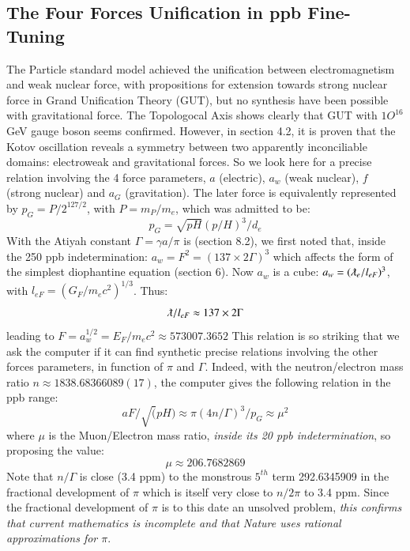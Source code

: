 \documentclass[twoside,draft]{article}
\begin{document}
\begin{sloppypar}
\subsection {The Four Forces Unification in ppb Fine-Tuning}
The Particle standard model achieved the unification between electromagnetism and weak nuclear force, with propositions for extension towards strong nuclear force in Grand Unification Theory (GUT), but no synthesis have been possible with gravitational force. The Topologocal Axis shows clearly that GUT with $1O^{16}$ GeV gauge boson seems confirmed. However, in section 4.2, it is proven that the Kotov oscillation reveals a symmetry between two apparently inconciliable domains: electroweak and gravitational forces. So we look here for a precise relation involving the 4 force parameters, $a$ (electric), $a_w$ (weak nuclear), $f$ (strong nuclear) and $a_G$ (gravitation). The later force is equivalently represented by $p_G = P/2^{127/2}$, with $P = m_P/m_e$, which was admitted to be:
\begin{equation}
p_G = \sqrt{pH} (p/H)^3/d_e
\end{equation}
 With the Atiyah constant $\Gamma = \gamma a/\pi$ is (section 8.2), we first noted that, inside the 250 ppb indetermination:  
 $a_{w} = F^2 = (137 \times 2 \Gamma)^{3}$
 which affects the form of the simplest diophantine equation (section 6).
 Now $a_{w}$ is a cube: $a_{w} = (\lambdabar_{e}/l_{eF})^{3}$, with $l_{eF} = (G_{F}/m_{e} c^{2})^{1/3}$. Thus:    
\begin{equation}
\lambdabar/l_{eF} \approx 137 \times 2\Gamma
\end{equation}
leading to $F = a_{w}^{1/2} = E_{F} /m_{e} c^{2} \approx 573007.3652$
This relation is so striking that we ask the computer if it can find synthetic precise relations involving the other forces parameters, in function of $\pi$ and $\Gamma$. Indeed, with the neutron/electron mass ratio $n \approx 1838.68366089(17)$, the computer gives the following relation in the ppb range:
\begin{equation}
aF/\sqrt(pH) \approx \pi(4n/\Gamma)^3/p_G \approx \mu^2
\end{equation}
where $\mu$ is the Muon/Electron mass ratio, \textit{inside its 20 ppb indetermination}, so proposing the value:
\begin{equation}
\mu \approx 206.7682869
\end{equation}
Note that $n/\Gamma$ is close (3.4 ppm) to the monstrous $5^{th}$ term 292.6345909 in
the fractional development of $\pi$ which is itself very close to $n/2\pi$ to 3.4 ppm. Since the fractional
development of $\pi$ is to this date an unsolved problem, \textit{this confirms that current mathematics is
incomplete and that Nature uses rational approximations for $\pi$}.


\end{sloppypar}
\end{document}
